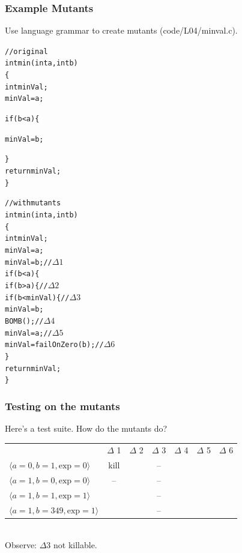 \documentclass{beamer}
\newenvironment{changemargin}[1]{%
  \begin{list}{}{%
    \setlength{\topsep}{0pt}%
    \setlength{\leftmargin}{#1}%
    \setlength{\rightmargin}{1em}
    \setlength{\listparindent}{\parindent}%
    \setlength{\itemindent}{\parindent}%
    \setlength{\parsep}{\parskip}%
  }%
  \item[]}{\end{list}}
\begin{document}
\begin{frame}[fragile]
  \frametitle{Example Mutants}
  \begin{changemargin}{2em}
    Use language grammar to create mutants (code/L04/minval.c).\\[1em]
  \end{changemargin}
  \small
\begin{minipage}[t]{.4\textwidth}
\begin{alltt}
// original
int min(int a, int b)
\{
  int minVal;
  minVal = a;

  if (b < a) \{


    minVal = b;



  \}
  return minVal;
\}
\end{alltt}
\end{minipage} \begin{minipage}[t]{.4\textwidth}
\begin{alltt}
// with mutants
int min(int a, int b)
\{
  int minVal;
  minVal = a;
  minVal = b;               // \(\Delta 1\)
  if (b < a) \{
  if (b > a) \{              // \(\Delta 2\)
  if (b < minVal) \{         // \(\Delta 3 \)
    minVal = b;
    BOMB();                 // \(\Delta 4\)
    minVal = a;             // \(\Delta 5\)
    minVal = failOnZero(b); // \(\Delta 6\)
  \}
  return minVal;
\}
\end{alltt}
\end{minipage}
  
\end{frame}

\begin{frame}[fragile]
  \frametitle{Testing on the mutants}

  \begin{changemargin}{2em}
    Here's a test suite. How do the mutants do? \\[1em]
\begin{tabular}{lcccccc}
  & $\Delta$ 1 & $\Delta$ 2 & $\Delta$ 3 & $\Delta$ 4 & $\Delta$ 5 & $\Delta$ 6\\ 
  $\langle a = 0, b = 1, \mathrm{exp} = 0 \rangle$   & kill & & -- \\
  $\langle a = 1, b = 0, \mathrm{exp} = 0 \rangle$   & --   & & -- \\
  $\langle a = 1, b = 1, \mathrm{exp} = 1 \rangle$   &      & & -- \\
  $\langle a = 1, b = 349, \mathrm{exp} = 1 \rangle$ &      & & -- \\
\end{tabular}

~\\
Observe: $\Delta 3$ not killable.
    
  \end{changemargin}
\end{frame}
\end{document}
